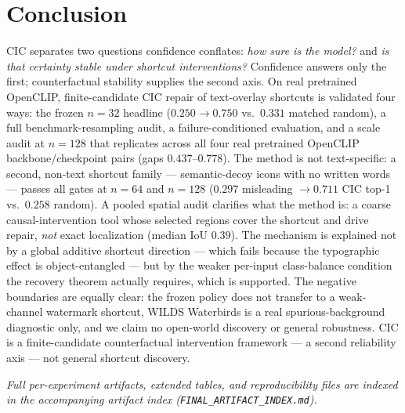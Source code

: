 \documentclass[11pt]{article}
\begin{document}
\FloatBarrier

\section{Conclusion}\label{sec:conclusion}
CIC separates two questions confidence conflates: \emph{how sure is the model?} and
\emph{is that certainty stable under shortcut interventions?} Confidence answers only
the first; counterfactual stability supplies the second axis. On real pretrained
OpenCLIP, finite-candidate CIC repair of text-overlay shortcuts is validated four
ways: the frozen $n=32$ headline ($0.250\to0.750$ vs.\ $0.331$ matched random), a
full benchmark-resampling audit, a failure-conditioned evaluation, and a scale audit
at $n=128$ that replicates across all four real pretrained OpenCLIP
backbone/checkpoint pairs (gaps $0.437$--$0.778$). The method is not text-specific: a
second, non-text shortcut family --- semantic-decoy icons with no written words ---
passes all gates at $n=64$ and $n=128$ ($0.297$ misleading $\to 0.711$ CIC top-1
vs.\ $0.258$ random). A pooled spatial audit clarifies what the method is: a coarse
causal-intervention tool whose selected regions cover the shortcut and drive repair,
\emph{not} exact localization (median IoU $0.39$). The mechanism is explained not by a
global additive shortcut direction --- which fails because the typographic effect is
object-entangled --- but by the weaker per-input class-balance condition the recovery
theorem actually requires, which is supported. The negative boundaries are equally
clear: the frozen policy does not transfer to a weak-channel watermark shortcut,
WILDS Waterbirds is a real spurious-background diagnostic only, and we claim no
open-world discovery or general robustness. CIC is a finite-candidate counterfactual
intervention framework --- a second reliability axis --- not general shortcut
discovery.

\noindent\emph{Full per-experiment artifacts, extended tables, and reproducibility
files are indexed in the accompanying artifact index
(\texttt{FINAL\_ARTIFACT\_INDEX.md}).}

\clearpage



\end{document}
